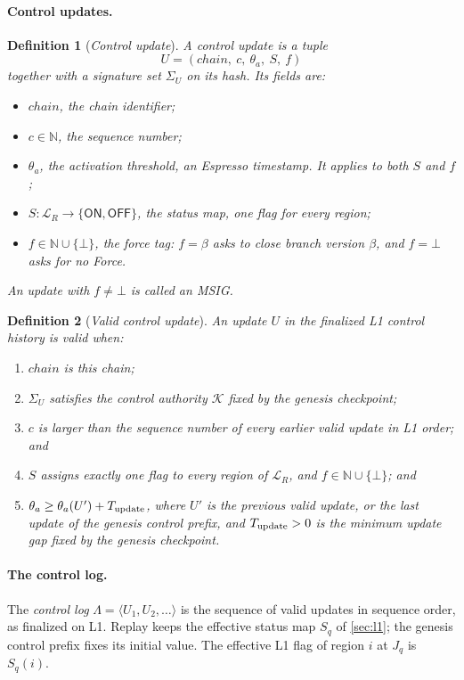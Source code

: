 \documentclass[11pt,a4paper]{article}
\newcommand{\tagg}[1]{\ensuremath{\mathsf{#1}}}
\newcommand{\defterm}[1]{\textcolor{rrBlue}{\textit{#1}}}
\newtheorem{definition}{Definition}[section]
\begin{document}
\paragraph{Control updates.}
\begin{definition}[\defterm{Control update}]
\label{def:control-update}
A control update is a tuple
\[
 U=(\mathit{chain},\ c,\ \theta_a,\ S,\ f)
\]
together with a signature set $\Sigma_U$ on its hash. Its fields are:
\begin{itemize}
\item $\mathit{chain}$, the chain identifier;
\item $c\in\mathbb N$, the sequence number;
\item $\theta_a$, the activation threshold, an Espresso timestamp. It
applies to both $S$ and $f$;
\item $S:\mathcal L_R\to\{\tagg{ON},\tagg{OFF}\}$, the \defterm{status
map}, one flag for every region;
\item $f\in\mathbb N\cup\{\bot\}$, the \defterm{force tag}: $f=\beta$
asks to close branch version $\beta$, and $f=\bot$ asks for no Force.
\end{itemize}
An update with $f\ne\bot$ is called an \defterm{MSIG}.
\end{definition}


\begin{definition}[\defterm{Valid control update}]
\label{def:control-valid}
An update $U$ in the finalized L1 control history is valid when:
\begin{enumerate}[label=(V\arabic*)]
\item $\mathit{chain}$ is this chain;
\item $\Sigma_U$ satisfies the control authority $\mathcal K$ fixed by
the genesis checkpoint;
\item $c$ is larger than the sequence number of every earlier valid
update in L1 order; and
\item $S$ assigns exactly one flag to every region of $\mathcal L_R$, and
$f\in\mathbb N\cup\{\bot\}$; and
\item $\theta_a\ge\theta_a(U')+T_{\rm update}$, where $U'$ is the
previous valid update, or the last update of the genesis control prefix,
and $T_{\rm update}>0$ is the minimum update gap fixed by the genesis
checkpoint.
\end{enumerate}
\end{definition}


\paragraph{The control log.}
The \defterm{control log} $\Lambda=\langle U_1,U_2,\ldots\rangle$ is the
sequence of valid updates in sequence order, as finalized on L1. Replay
keeps the effective status map $S_q$ of \cref{sec:l1}; the
genesis control prefix fixes its initial value. The effective L1 flag of
region $i$ at $J_q$ is $S_q(i)$.
\end{document}
